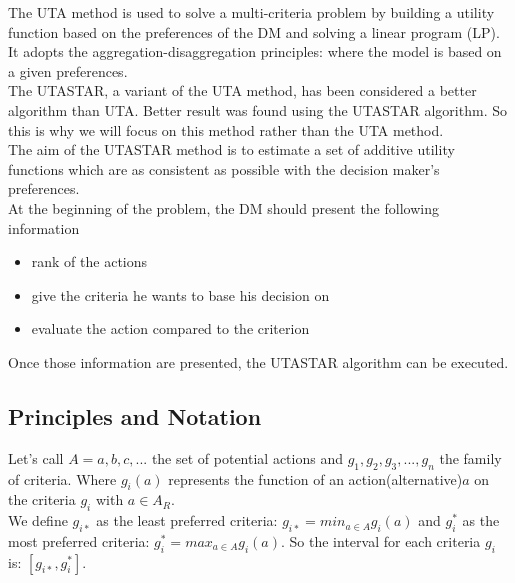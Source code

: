 \documentclass{report}
\begin{document}
The UTA method is used to solve a multi-criteria problem by building a utility function based on the preferences of the DM and solving a linear program (LP). It adopts the aggregation-disaggregation principles: where the model is based on a given preferences.\\ The UTASTAR, a variant of the UTA method, has been considered a better algorithm than UTA. Better result was found using the UTASTAR algorithm. So this is why we will focus on this method rather than the UTA method.\\The aim of the UTASTAR method is to estimate a set of additive utility functions which are as consistent as possible with the decision maker's preferences.\\
At the beginning of the problem, the DM should present the following information 
\begin{itemize}
\item rank of the actions
\item give the criteria he wants to base his decision on 
\item evaluate the action compared to the criterion
\end{itemize}
Once those information are presented, the UTASTAR algorithm can be executed. 

\newpage
\subsection{Principles and Notation}
Let's call $A={a,b,c,...}$ the set of potential actions and $g_1, g_2, g_3, ..., g_n$ the family of criteria. Where $g_i(a)$ represents the function of an action(alternative)$a$ on the criteria $g_i$ with $a \in A_R$. \\

We define $g_{i*}$ as the least preferred criteria: $g_{i*} = min_{a \in A} g_i (a)$ and $g_i^{*}$ as the most preferred criteria: $g_i^{*} = max_{a \in A} g_i (a)$. So the interval for each criteria $g_i$ is: $[g_{i*} , g_i^{*}]$.\\
\end{document}
